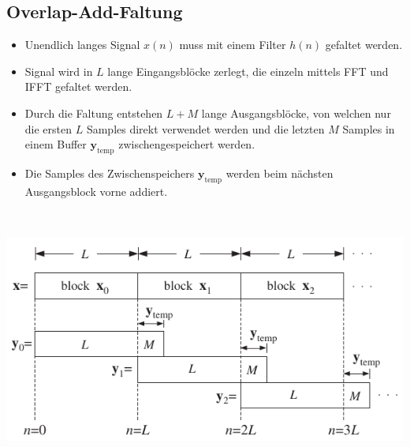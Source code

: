 	\subsection{Overlap-Add-Faltung}
			\begin{itemize}
			 \item Unendlich langes Signal $x(n)$ muss mit einem Filter $h(n)$ gefaltet werden.\\[-0.42cm]
			 \end{itemize}
		\begin{minipage}{0.55\textwidth}
			\begin{itemize}
			 \item Signal wird in $L$ lange Eingangsblöcke zerlegt, die einzeln mittels FFT und IFFT gefaltet werden.\\[-0.4cm]
			 \item Durch die Faltung entstehen $L+M$ lange Ausgangsblöcke, von welchen nur die ersten $L$ Samples direkt verwendet werden und die letzten $M$ Samples in einem Buffer $\bm{y}_\text{temp}$ zwischengespeichert werden.\\[-0.4cm]
			 \item Die Samples des Zwischenspeichers $\bm{y}_\text{temp}$ werden beim nächsten Ausgangsblock vorne addiert.
			\end{itemize}
		\end{minipage}\begin{minipage}{0.02\textwidth}$ $\end{minipage}
		\begin{minipage}{0.45\textwidth}
			\includegraphics[width = \textwidth]{pic/overlapAdd.pdf}
		\end{minipage}
\newpage
